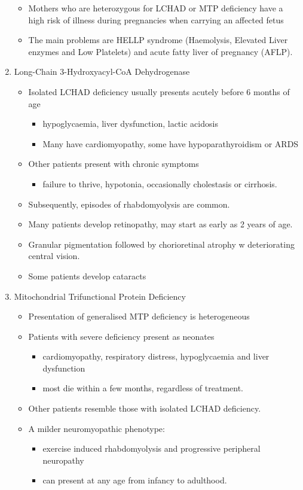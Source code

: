 \documentclass{scrartcl}
\begin{document}
\begin{enumerate}
\begin{itemize}
\item Mothers who are heterozygous for LCHAD or MTP deficiency have a high
risk of illness during pregnancies when carrying an affected fetus
\item The main problems are HELLP syndrome (Haemolysis, Elevated Liver
enzymes and Low Platelets) and acute fatty liver of pregnancy
(AFLP).
\end{itemize}

\item Long-Chain 3-Hydroxyacyl-CoA Dehydrogenase
\label{sec:orgb97a8d7}
\begin{itemize}
\item Isolated LCHAD deficiency usually presents acutely before 6 months of age
\begin{itemize}
\item hypoglycaemia, liver dysfunction, lactic acidosis
\item Many have cardiomyopathy, some have hypoparathyroidism or ARDS
\end{itemize}
\item Other patients present with chronic symptoms
\begin{itemize}
\item failure to thrive, hypotonia, occasionally cholestasis or cirrhosis.
\end{itemize}
\item Subsequently, episodes of rhabdomyolysis are common.
\item Many patients develop retinopathy, may start as early as 2 years of age.
\item Granular pigmentation followed by chorioretinal atrophy w deteriorating central vision.
\item Some patients develop cataracts
\end{itemize}

\item Mitochondrial Trifunctional Protein Deficiency
\label{sec:org7f25d13}
\begin{itemize}
\item Presentation of generalised MTP deficiency is heterogeneous
\item Patients with severe deficiency present as neonates
\begin{itemize}
\item cardiomyopathy, respiratory distress, hypoglycaemia and liver dysfunction
\item most die within a few months, regardless of treatment.
\end{itemize}
\item Other patients resemble those with isolated LCHAD deficiency.
\item A milder neuromyopathic phenotype:
\begin{itemize}
\item exercise induced rhabdomyolysis and progressive peripheral
neuropathy
\item can present at any age from infancy to adulthood.
\end{itemize}
\end{itemize}


\end{enumerate}
\end{document}
